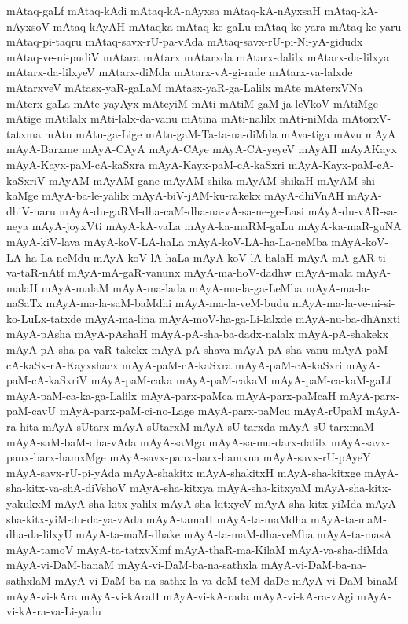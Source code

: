 {mAtaq-gaLf
mAtaq-kAdi
mAtaq-kA-nAyxsa
mAtaq-kA-nAyxsaH
mAtaq-kA-nAyxsoV
mAtaq-kAyAH
mAtaqka
mAtaq-ke-gaLu
mAtaq-ke-yara
mAtaq-ke-yaru
mAtaq-pi-taqru
mAtaq-savx-rU-pa-vAda
mAtaq-savx-rU-pi-Ni-yA-gidudx
mAtaq-ve-ni-pudiV
mAtara
mAtarx
mAtarxda
mAtarx-dalilx
mAtarx-da-lilxya
mAtarx-da-lilxyeV
mAtarx-diMda
mAtarx-vA-gi-rade
mAtarx-va-lalxde
mAtarxveV
mAtasx-yaR-gaLaM
mAtasx-yaR-ga-Lalilx
mAte
mAterxVNa
mAterx-gaLa
mAte-yayAyx
mAteyiM
mAti
mAtiM-gaM-ja-leVkoV
mAtiMge
mAtige
mAtilalx
mAti-lalx-da-vanu
mAtina
mAti-nalilx
mAti-niMda
mAtorxV-tatxma
mAtu
mAtu-ga-Lige
mAtu-gaM-Ta-ta-na-diMda
mAva-tiga
mAvu
mAyA
mAyA-Barxme
mAyA-CAyA
mAyA-CAye
mAyA-CA-yeyeV
mAyAH
mAyAKayx
mAyA-Kayx-paM-cA-kaSxra
mAyA-Kayx-paM-cA-kaSxri
mAyA-Kayx-paM-cA-kaSxriV
mAyAM
mAyAM-gane
mAyAM-shika
mAyAM-shikaH
mAyAM-shi-kaMge
mAyA-ba-le-yalilx
mAyA-biV-jAM-ku-rakekx
mAyA-dhiVnAH
mAyA-dhiV-naru
mAyA-du-gaRM-dha-caM-dha-na-vA-sa-ne-ge-Lasi
mAyA-du-vAR-sa-neya
mAyA-joyxVti
mAyA-kA-vaLa
mAyA-ka-maRM-gaLu
mAyA-ka-maR-guNA
mAyA-kiV-lava
mAyA-koV-LA-haLa
mAyA-koV-LA-ha-La-neMba
mAyA-koV-LA-ha-La-neMdu
mAyA-koV-lA-haLa
mAyA-koV-lA-halaH
mAyA-mA-gAR-ti-va-taR-nAtf
mAyA-mA-gaR-vanunx
mAyA-ma-hoV-dadhw
mAyA-mala
mAyA-malaH
mAyA-malaM
mAyA-ma-lada
mAyA-ma-la-ga-LeMba
mAyA-ma-la-naSaTx
mAyA-ma-la-saM-baMdhi
mAyA-ma-la-veM-budu
mAyA-ma-la-ve-ni-si-ko-LuLx-tatxde
mAyA-ma-lina
mAyA-moV-ha-ga-Li-lalxde
mAyA-nu-ba-dhAnxti
mAyA-pAsha
mAyA-pAshaH
mAyA-pA-sha-ba-dadx-nalalx
mAyA-pA-shakekx
mAyA-pA-sha-pa-vaR-takekx
mAyA-pA-shava
mAyA-pA-sha-vanu
mAyA-paM-cA-kaSx-rA-Kayxshacx
mAyA-paM-cA-kaSxra
mAyA-paM-cA-kaSxri
mAyA-paM-cA-kaSxriV
mAyA-paM-caka
mAyA-paM-cakaM
mAyA-paM-ca-kaM-gaLf
mAyA-paM-ca-ka-ga-Lalilx
mAyA-parx-paMca
mAyA-parx-paMcaH
mAyA-parx-paM-cavU
mAyA-parx-paM-ci-no-Lage
mAyA-parx-paMcu
mAyA-rUpaM
mAyA-ra-hita
mAyA-sUtarx
mAyA-sUtarxM
mAyA-sU-tarxda
mAyA-sU-tarxmaM
mAyA-saM-baM-dha-vAda
mAyA-saMga
mAyA-sa-mu-darx-dalilx
mAyA-savx-panx-barx-hamxMge
mAyA-savx-panx-barx-hamxna
mAyA-savx-rU-pAyeY
mAyA-savx-rU-pi-yAda
mAyA-shakitx
mAyA-shakitxH
mAyA-sha-kitxge
mAyA-sha-kitx-va-shA-diVshoV
mAyA-sha-kitxya
mAyA-sha-kitxyaM
mAyA-sha-kitx-yakukxM
mAyA-sha-kitx-yalilx
mAyA-sha-kitxyeV
mAyA-sha-kitx-yiMda
mAyA-sha-kitx-yiM-du-da-ya-vAda
mAyA-tamaH
mAyA-ta-maMdha
mAyA-ta-maM-dha-da-lilxyU
mAyA-ta-maM-dhake
mAyA-ta-maM-dha-veMba
mAyA-ta-masA
mAyA-tamoV
mAyA-ta-tatxvXmf
mAyA-thaR-ma-KilaM
mAyA-va-sha-diMda
mAyA-vi-DaM-banaM
mAyA-vi-DaM-ba-na-sathxla
mAyA-vi-DaM-ba-na-sathxlaM
mAyA-vi-DaM-ba-na-sathx-la-va-deM-teM-daDe
mAyA-vi-DaM-binaM
mAyA-vi-kAra
mAyA-vi-kAraH
mAyA-vi-kA-rada
mAyA-vi-kA-ra-vAgi
mAyA-vi-kA-ra-va-Li-yadu
}
